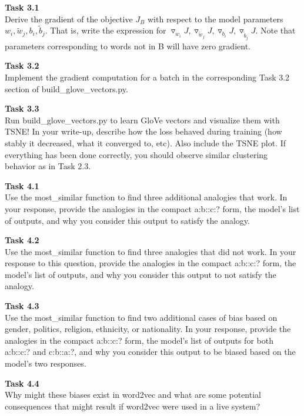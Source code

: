 \documentclass[12pt,article]{article}
\newenvironment{task}[2][Task]
    { \begin{mdframed}[backgroundcolor=gray!20] \textbf{#1 #2} \\}
    {  \end{mdframed}}
\begin{document}
\newpage
\begin{task}{3.1}
Derive the gradient of the objective $J_B$ with respect to the model parameters $w_i, \widetilde{w}_j, b_i, \widetilde{b}_j$. That is, write the expression for $\triangledown_{w_i}J, \triangledown_{\widetilde{w}_j}J, \triangledown_{b_i}J, \triangledown_{\widetilde{b}_j}J$. Note that parameters corresponding to words not in B will have zero gradient.
\end{task}

\begin{task}{3.2} 
Implement the gradient computation for a batch in the corresponding Task 3.2 section of build\_glove\_vectors.py.
\end{task}

\begin{task}{3.3} 
Run build\_glove\_vectors.py to learn GloVe vectors and visualize them with TSNE! In your write-up, describe how the loss behaved during training (how stably it decreased, what it converged to, etc). Also include the TSNE plot. If everything has been done correctly, you should observe similar clustering behavior as in Task 2.3.
\end{task}

\newpage
\begin{task}{4.1} 
Use the most\_similar function to find three additional analogies that work. In your response, provide the analogies in the compact a:b::c:? form, the model's list of outputs, and why you consider this output to satisfy the analogy.
\end{task}

\begin{task}{4.2} 
Use the most\_similar function to find three analogies that did not work. In your response to this question, provide the analogies in the compact a:b::c:? form, the model's list of outputs, and why you consider this output to not satisfy the analogy.
\end{task}

\begin{task}{4.3} 
Use the most\_similar function to find two additional cases of bias based on gender, politics, religion, ethnicity, or nationality. In your response, provide the analogies in the compact a:b::c:? form, the model's list of outputs for both a:b::c:? and c:b::a:?, and why you consider this output to be biased based on the model's two responses.
\end{task}

\begin{task}{4.4} 
Why might these biases exist in word2vec and what are some potential consequences that might result if word2vec were used in a live system?
\end{task}



\end{document}
